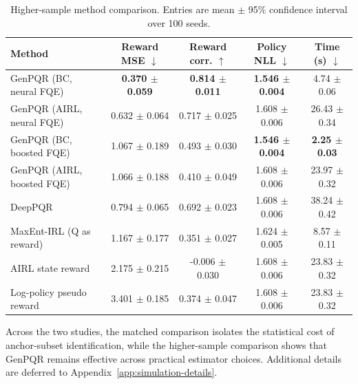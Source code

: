 \begin{table}[htb]
\centering
\caption{Higher-sample method comparison. Entries are mean $\pm$ 95\% confidence interval over 100 seeds.}
\label{tab:exp2_methods}
\scriptsize
\setlength{\tabcolsep}{4pt}
\begin{tabular}{lcccc}
\toprule
Method & Reward MSE $\downarrow$ & Reward corr. $\uparrow$ & Policy NLL $\downarrow$ & Time (s) $\downarrow$ \\
\midrule
GenPQR (BC, neural FQE) & \textbf{0.370 $\pm$ 0.059} & \textbf{0.814 $\pm$ 0.011} & \textbf{1.546 $\pm$ 0.004} & 4.74 $\pm$ 0.06 \\
GenPQR (AIRL, neural FQE) & 0.632 $\pm$ 0.064 & 0.717 $\pm$ 0.025 & 1.608 $\pm$ 0.006 & 26.43 $\pm$ 0.34 \\
GenPQR (BC, boosted FQE) & 1.067 $\pm$ 0.189 & 0.493 $\pm$ 0.030 & \textbf{1.546 $\pm$ 0.004} & \textbf{2.25 $\pm$ 0.03} \\
GenPQR (AIRL, boosted FQE) & 1.066 $\pm$ 0.188 & 0.410 $\pm$ 0.049 & 1.608 $\pm$ 0.006 & 23.97 $\pm$ 0.32 \\
\midrule
DeepPQR & 0.794 $\pm$ 0.065 & 0.692 $\pm$ 0.023 & 1.608 $\pm$ 0.006 & 38.24 $\pm$ 0.42 \\
MaxEnt-IRL (Q as reward) & 1.167 $\pm$ 0.177 & 0.351 $\pm$ 0.027 & 1.624 $\pm$ 0.005 & 8.57 $\pm$ 0.11 \\
AIRL state reward & 2.175 $\pm$ 0.215 & -0.006 $\pm$ 0.030 & 1.608 $\pm$ 0.006 & 23.83 $\pm$ 0.32 \\
Log-policy pseudo reward & 3.401 $\pm$ 0.185 & 0.374 $\pm$ 0.047 & 1.608 $\pm$ 0.006 & 23.83 $\pm$ 0.32 \\
\bottomrule
\end{tabular}
\end{table}

Across the two studies, the matched comparison isolates the statistical cost of anchor-subset identification, while the higher-sample comparison shows that GenPQR remains effective across practical estimator choices. Additional details are deferred to Appendix~\ref{app:simulation-details}.
